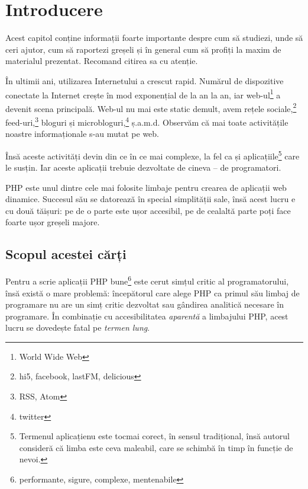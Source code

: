 \fancyfoot[CO,C] {\thepage}
{}
\chapter*{Introducere}


\begin{chapsummary}
Acest capitol conține informații foarte importante despre cum să
studiezi, unde să ceri ajutor, cum să raportezi greșeli și în general cum să
profiți la maxim de materialul prezentat. Recomand citirea sa cu atenție.
\end{chapsummary}

În ultimii ani, utilizarea Internetului a crescut rapid. Numărul de dispozitive
conectate la Internet crește în mod exponențial de la an la an, iar
web-ul\footnote
{World Wide Web} a devenit scena principală. Web-ul nu mai este static demult,
avem rețele sociale,\footnote{hi5, facebook, lastFM, delicious}
feed-uri,\footnote{RSS, Atom} bloguri și microbloguri,\footnote{twitter}
ș.a.m.d. Observăm că mai toate activitățile noastre informaționale s-au mutat 
pe web.

Însă aceste activități devin din ce în ce mai complexe, la fel ca și
aplicațiile\footnote{Termenul \glqq aplicație\grqq nu este tocmai corect, în sensul
tradițional, însă autorul consideră că limba este ceva maleabil, care se
schimbă în timp în funcție de nevoi.} care le susțin.
Iar aceste aplicații trebuie dezvoltate de cineva -- de programatori.

PHP este unul dintre cele mai folosite limbaje pentru crearea de aplicații
web dinamice. Succesul său se datorează în special simplității sale, însă
acest lucru e cu două tăișuri: pe de o parte este ușor accesibil, pe de
cealaltă parte poți face foarte ușor greșeli majore.

{}
\section*{Scopul acestei cărți}

Pentru a scrie aplicații PHP bune\footnote{performante, sigure, complexe, mentenabile}
este cerut simțul critic al programatorului,
însă există o mare problemă: începătorul care alege PHP ca
primul său limbaj de programare nu are un simț critic dezvoltat sau gândirea analitică
necesare în programare. În combinație cu accesibilitatea \textit{aparentă}
a limbajului PHP, acest lucru se dovedește fatal pe \textit{termen lung}.


